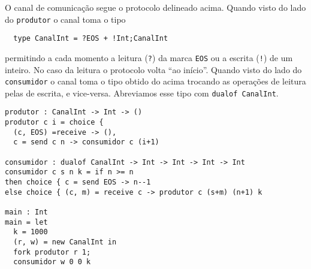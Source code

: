 O canal de comunicação segue o  protocolo delineado acima. Quando
visto do lado do \lstinline|produtor| o canal toma o tipo
%
\begin{lstlisting}
  type CanalInt = ?EOS + !Int;CanalInt
\end{lstlisting}
%
permitindo a cada momento a leitura (\lstinline|?|) da marca
\lstinline|EOS| ou a escrita (\lstinline|!|) de um inteiro. No caso da
leitura o protocolo volta ``ao início''.
%
Quando visto do lado do \lstinline|consumidor| o canal toma o tipo
obtido do acima trocando as operações de leitura pelas de escrita, e
vice-versa. Abreviamos esse tipo com \lstinline|dualof CanalInt|.

\begin{lstlisting}
produtor : CanalInt -> Int -> ()
produtor c i = choice {
  (c, EOS) =receive -> (),
  c = send c n -> consumidor c (i+1)

consumidor : dualof CanalInt -> Int -> Int -> Int -> Int
consumidor c s n k = if n >= n
then choice { c = send EOS -> n--1
else choice { (c, m) = receive c -> produtor c (s+m) (n+1) k

main : Int
main = let
  k = 1000
  (r, w) = new CanalInt in
  fork produtor r 1;
  consumidor w 0 0 k
\end{lstlisting}




